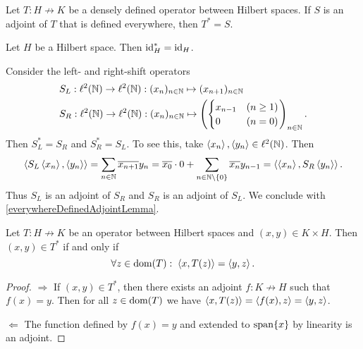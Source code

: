 \begin{lemma} \label{everywhereDefinedAdjointLemma}
Let $T: H\not\to K$ be a densely defined operator between Hilbert spaces. If $S$ is an adjoint of $T$ that is defined everywhere, then $T^* = S$.
\end{lemma}
\begin{corollary}
Let $H$ be a Hilbert space. Then $\operatorname{id}_H^* = \operatorname{id}_H$.
\end{corollary}

\begin{example}
Consider the left- and right-shift operators
\begin{align*}
&S_L: \ell^2(\mathbb{N}) \to \ell^2(\mathbb{N}): (x_n)_{n\in\mathbb{N}} \mapsto (x_{n+1})_{n\in\mathbb{N}} \\
&S_R: \ell^2(\mathbb{N}) \to \ell^2(\mathbb{N}): (x_n)_{n\in\mathbb{N}} \mapsto \left(\begin{cases}
x_{n-1} & (n\geq 1) \\ 0 &(n=0)
\end{cases}\right)_{n\in \mathbb{N}}.
\end{align*}
Then $S_L^* = S_R$ and $S_R^* = S_L$. To see this, take $\left\langle x_n \right\rangle, \left\langle y_n \right\rangle\in \ell^2(\mathbb{N})$. Then
\[ \left\langle S_L\left\langle x_n \right\rangle, \left\langle y_n \right\rangle \right\rangle = \sum_{n\in\mathbb{N}}\overline{x_{n+1}}y_n = \overline{x_0}\cdot 0 + \sum_{n\in\mathbb{N}\setminus\{0\}}\overline{x_{n}}y_{n-1} = \left\langle \left\langle x_n \right\rangle, S_R\left\langle y_n \right\rangle \right\rangle. \]
Thus $S_L$ is an adjoint of $S_R$ and $S_R$ is an adjoint of $S_L$. We conclude with \ref{everywhereDefinedAdjointLemma}.
\end{example}

\begin{lemma} \label{adjointRelationLemma}
Let $T: H\not\to K$ be an operator between Hilbert spaces and $(x,y)\in K\times H$. Then $(x, y)\in T^*$ \textup{if and only if}
\[ \forall z\in\operatorname{dom}(T): \; \left\langle x, T(z) \right\rangle = \left\langle y, z \right\rangle. \]
\end{lemma}
\begin{proof}
$\boxed{\Rightarrow}$ If $(x, y)\in T^*$, then there exists an adjoint $f: K\not\to H$ such that $f(x) = y$. Then for all $z\in \operatorname{dom}(T)$ we have $\left\langle x, T(z) \right\rangle = \left\langle f(x), z \right\rangle = \left\langle y, z \right\rangle$.

$\boxed{\Leftarrow}$ The function defined by $f(x) = y$ and extended to $\operatorname{span}\{x\}$ by linearity is an adjoint.
\end{proof}


